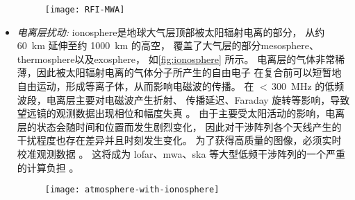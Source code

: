 \begin{itemize}
\begin{figure}[htp]
  \centering
  \texttt{[image: RFI-MWA]}
  \label{fig:rfi-mwa}
\end{figure}

\item
\emph{电离层扰动:}
\ac{ionosphere}是地球大气层顶部被太阳辐射电离的部分，
从约 \SI{60}{\km} 延伸至约 \SI{1000}{\km} 的高空，
覆盖了大气层的部分\ac{mesosphere}、\ac{thermosphere}以及\ac{exosphere}，
如\autoref{fig:ionosphere} 所示。
电离层的气体非常稀薄，因此被太阳辐射电离的气体分子所产生的自由电子
在复合前可以短暂地自由运动，形成等离子体，从而影响电磁波的传播。
在 $<$\,\SI{300}{\MHz} 的低频波段，电离层主要对电磁波产生折射、
传播延迟、Faraday 旋转等影响，导致望远镜的观测数据出现相位和幅度失真
\cite{intema2009,thompson2017}。
由于主要受太阳活动的影响，电离层的状态会随时间和位置而发生剧烈变化，
因此对干涉阵列各个天线产生的干扰程度也存在差异并且时刻发生变化。
为了获得高质量的图像，必须实时校准观测数据 \cite{intema2009,jordan2017}。
这将成为 \ac{lofar}、\ac{mwa}、\ac{ska} 等大型低频干涉阵列的一个严重的计算负担
\cite{intema2009,deGasperin2018}。

\begin{figure}[htp]
  \centering
  \texttt{[image: atmosphere-with-ionosphere]}
  \label{fig:ionosphere}
\end{figure}


\end{itemize}

